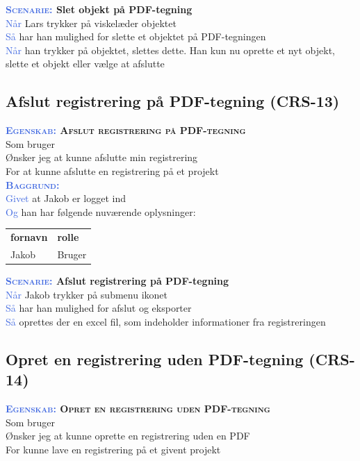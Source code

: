 \textbf{\textsc{\textcolor{RoyalBlue}{Scenarie:}} Slet objekt på PDF-tegning}\\
\textcolor{RoyalBlue}{Når} Lars trykker på viskelæder objektet\\
\textcolor{RoyalBlue}{Så}  har han mulighed for slette et objektet på PDF-tegningen\\
\textcolor{RoyalBlue}{Når} han trykker på objektet, slettes dette. Han kun nu oprette et nyt objekt, slette et objekt eller vælge at afslutte \\

\subsection{Afslut registrering på PDF-tegning (CRS-13)} \label{sec:USAfslutRegPåPDF}
\textbf{\textsc{\textcolor{RoyalBlue}{Egenskab:} Afslut registrering på PDF-tegning}}\\
Som bruger\\
Ønsker jeg at kunne afslutte min registrering\\
For at kunne afslutte en registrering på et projekt\\

\textsc{\textcolor{RoyalBlue}{\textbf{Baggrund:}}}\\
\textcolor{RoyalBlue}{Givet} at Jakob er logget ind\\
\textcolor{RoyalBlue}{Og} han har følgende nuværende oplysninger:\\
\begin{tabular}{| l | l |}
	\textbf{fornavn} & \textbf{rolle} \\
	Jakob & Bruger\\
\end{tabular}
\newline

\textbf{\textsc{\textcolor{RoyalBlue}{Scenarie:}} Afslut registrering på PDF-tegning}\\
\textcolor{RoyalBlue}{Når} Jakob trykker på submenu ikonet\\
\textcolor{RoyalBlue}{Så}  har han mulighed for afslut og eksporter\\
\textcolor{RoyalBlue}{Så}  oprettes der en excel fil, som indeholder informationer fra registreringen\\

\subsection{Opret en registrering uden PDF-tegning (CRS-14)} \label{sec:USOpretRegUdenPDF}
\textbf{\textsc{\textcolor{RoyalBlue}{Egenskab:} Opret en registrering uden PDF-tegning}}\\
Som bruger\\
Ønsker jeg at kunne oprette en registrering uden en PDF\\
For kunne lave en registrering på et givent projekt\\


